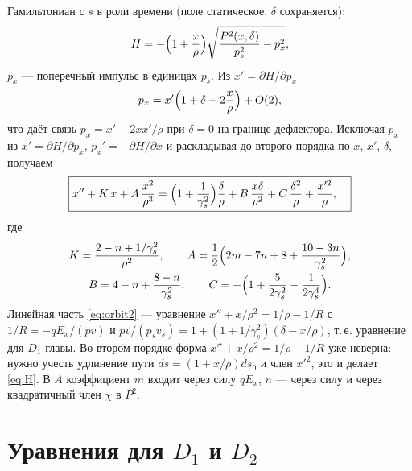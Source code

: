 \documentclass[12pt,a4paper]{article}
\numberwithin{equation}{section}
\begin{document}
Гамильтониан с $s$ в роли времени (поле статическое, $\delta$ сохраняется):
\begin{equation}\label{eq:H}
H=-\Bigl(1+\frac x\rho\Bigr)\sqrt{\frac{P^2(x,\delta)}{p_s^2}-p_x^2},
\end{equation}
$p_x$ --- поперечный импульс в единицах $p_s$. Из $x'=\partial H/\partial p_x$
\begin{equation}\label{eq:px}
p_x=x'\Bigl(1+\delta-2\frac x\rho\Bigr)+O(2),
\end{equation}
что даёт связь $p_x=x'-2xx'/\rho$ при $\delta=0$ на границе дефлектора. Исключая $p_x$ из
$x'=\partial H/\partial p_x$, $p_x'=-\partial H/\partial x$ и раскладывая до второго порядка
по $x$, $x'$, $\delta$, получаем
\begin{equation}\label{eq:orbit2}
\boxed{\begin{aligned}
x''+K\,x+A\,\frac{x^2}{\rho^3}
&=\Bigl(1+\frac1{\gamma_s^2}\Bigr)\frac{\delta}{\rho}+B\,\frac{x\delta}{\rho^2}+C\,\frac{\delta^2}{\rho}+\frac{x'^2}{\rho},
\end{aligned}}
\end{equation}
где
\begin{equation}\label{eq:coef}
\begin{gathered}
K=\frac{2-n+1/\gamma_s^2}{\rho^2},\qquad
A=\frac12\Bigl(2m-7n+8+\frac{10-3n}{\gamma_s^2}\Bigr),\\
B=4-n+\frac{8-n}{\gamma_s^2},\qquad
C=-\Bigl(1+\frac{5}{2\gamma_s^2}-\frac{1}{2\gamma_s^4}\Bigr).
\end{gathered}
\end{equation}
Линейная часть \eqref{eq:orbit2} --- уравнение $x''+x/\rho^2=1/\rho-1/R$ с $1/R=-qE_x/(pv)$ и
$pv/(p_sv_s)=1+(1+1/\gamma_s^2)(\delta-x/\rho)$, т.\,е. уравнение для $D_1$ главы.
Во втором порядке форма $x''+x/\rho^2=1/\rho-1/R$ уже неверна: нужно учесть удлинение
пути $ds=(1+x/\rho)ds_0$ и член $x'^2$, это и делает \eqref{eq:H}. В $A$ коэффициент $m$
входит через силу $qE_x$, $n$ --- через силу и через квадратичный член $\chi$ в $P^2$.

\section{Уравнения для $D_1$ и $D_2$}
\end{document}
